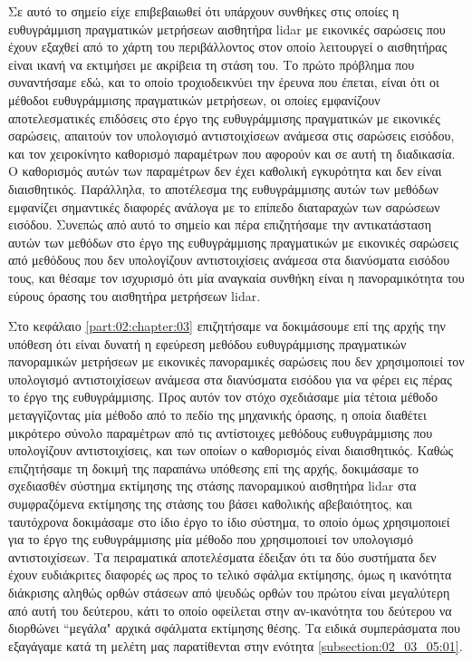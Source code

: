 Σε αυτό το σημείο είχε επιβεβαιωθεί ότι υπάρχουν συνθήκες στις οποίες η
ευθυγράμμιση πραγματικών μετρήσεων αισθητήρα lidar με εικονικές σαρώσεις που
έχουν εξαχθεί από το χάρτη του περιβάλλοντος στον οποίο λειτουργεί ο αισθητήρας
είναι ικανή να εκτιμήσει με ακρίβεια τη στάση του. Το πρώτο πρόβλημα που
συναντήσαμε εδώ, και το οποίο τροχιοδεικνύει την έρευνα που έπεται, είναι ότι
οι μέθοδοι ευθυγράμμισης πραγματικών μετρήσεων, οι οποίες εμφανίζουν
αποτελεσματικές επιδόσεις στο έργο της ευθυγράμμισης πραγματικών με εικονικές
σαρώσεις, απαιτούν τον υπολογισμό αντιστοιχίσεων ανάμεσα στις σαρώσεις εισόδου,
και τον χειροκίνητο καθορισμό παραμέτρων που αφορούν και σε αυτή τη διαδικασία.
Ο καθορισμός αυτών των παραμέτρων δεν έχει καθολική εγκυρότητα και δεν είναι
διαισθητικός. Παράλληλα, το αποτέλεσμα της ευθυγράμμισης αυτών των μεθόδων
εμφανίζει σημαντικές διαφορές ανάλογα με το επίπεδο διαταραχών των σαρώσεων
εισόδου. Συνεπώς από αυτό το σημείο και πέρα επιζητήσαμε την αντικατάσταση
αυτών των μεθόδων στο έργο της ευθυγράμμισης πραγματικών με εικονικές σαρώσεις
από μεθόδους που δεν υπολογίζουν αντιστοιχίσεις ανάμεσα στα διανύσματα εισόδου
τους, και θέσαμε τον ισχυρισμό ότι μία αναγκαία συνθήκη είναι η πανοραμικότητα
του εύρους όρασης του αισθητήρα μετρήσεων lidar.

Στο κεφάλαιο \ref{part:02:chapter:03} επιζητήσαμε να δοκιμάσουμε επί της αρχής
την υπόθεση ότι είναι δυνατή η εφεύρεση μεθόδου ευθυγράμμισης πραγματικών
πανοραμικών μετρήσεων με εικονικές πανοραμικές σαρώσεις που δεν χρησιμοποιεί
τον υπολογισμό αντιστοιχίσεων ανάμεσα στα διανύσματα εισόδου για να φέρει εις
πέρας το έργο της ευθυγράμμισης. Προς αυτόν τον στόχο σχεδιάσαμε μία τέτοια
μέθοδο μεταγγίζοντας μία μέθοδο από το πεδίο της μηχανικής όρασης, η οποία
διαθέτει μικρότερο σύνολο παραμέτρων από τις αντίστοιχες μεθόδους ευθυγράμμισης
που υπολογίζουν αντιστοιχίσεις, και των οποίων ο καθορισμός είναι διαισθητικός.
Καθώς επιζητήσαμε τη δοκιμή της παραπάνω υπόθεσης επί της αρχής, δοκιμάσαμε το
σχεδιασθέν σύστημα εκτίμησης της στάσης πανοραμικού αισθητήρα lidar στα
συμφραζόμενα εκτίμησης της στάσης του βάσει καθολικής αβεβαιότητος, και
ταυτόχρονα δοκιμάσαμε στο ίδιο έργο το ίδιο σύστημα, το οποίο όμως χρησιμοποιεί
για το έργο της ευθυγράμμισης μία μέθοδο που χρησιμοποιεί τον υπολογισμό
αντιστοιχίσεων. Τα πειραματικά αποτελέσματα έδειξαν ότι τα δύο συστήματα δεν
έχουν ευδιάκριτες διαφορές ως προς το τελικό σφάλμα εκτίμησης, όμως η ικανότητα
διάκρισης αληθώς ορθών στάσεων από ψευδώς ορθών του πρώτου είναι μεγαλύτερη από
αυτή του δεύτερου, κάτι το οποίο οφείλεται στην αν-ικανότητα του δεύτερου να
διορθώνει ``μεγάλα" αρχικά σφάλματα εκτίμησης θέσης. Τα ειδικά συμπεράσματα που
εξαγάγαμε κατά τη μελέτη μας παρατίθενται στην ενότητα
\ref{subsection:02_03_05:01}.


